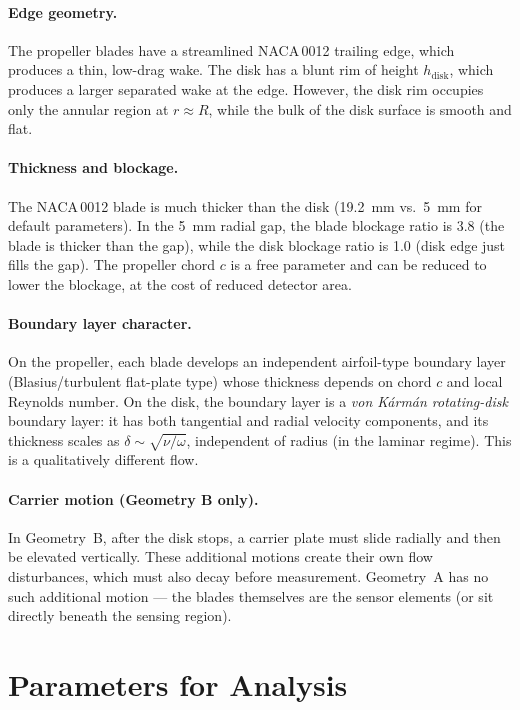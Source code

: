 \documentclass[11pt,a4paper]{article}
\begin{document}
\paragraph{Edge geometry.}
The propeller blades have a streamlined NACA\,0012 trailing edge, which
produces a thin, low-drag wake. The disk has a blunt rim of height
$h_\mathrm{disk}$, which produces a larger separated wake at the edge.
However, the disk rim occupies only the annular region at
$r \approx R$, while the bulk of the disk surface is smooth and flat.

\paragraph{Thickness and blockage.}
The NACA\,0012 blade is much thicker than the disk
(\SI{19.2}{mm} vs.\ \SI{5}{mm} for default parameters). In the
\SI{5}{mm} radial gap, the blade blockage ratio is 3.8 (the blade is
thicker than the gap), while the disk blockage ratio is 1.0 (disk edge
just fills the gap). The propeller chord $c$ is a free parameter and
can be reduced to lower the blockage, at the cost of reduced detector
area.

\paragraph{Boundary layer character.}
On the propeller, each blade develops an independent airfoil-type
boundary layer (Blasius/turbulent flat-plate type) whose thickness
depends on chord $c$ and local Reynolds number. On the disk, the
boundary layer is a \emph{von K\'arm\'an rotating-disk} boundary layer:
it has both tangential and radial velocity components, and its thickness
scales as $\delta \sim \sqrt{\nu/\omega}$, independent of radius
(in the laminar regime). This is a qualitatively different flow.

\paragraph{Carrier motion (Geometry B only).}
In Geometry~B, after the disk stops, a carrier plate must slide
radially and then be elevated vertically. These additional motions
create their own flow disturbances, which must also decay before
measurement. Geometry~A has no such additional motion --- the blades
themselves are the sensor elements (or sit directly beneath the sensing
region).


\section{Parameters for Analysis}
\label{sec:params}
\end{document}
